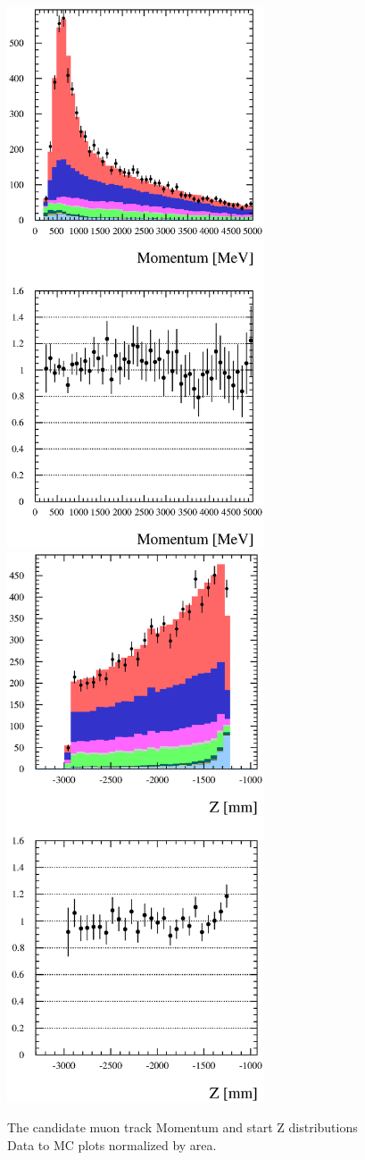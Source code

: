 \begin{figure}[h]
  \centering
  \includegraphics[width=3in]{Figures/P0DTrackerMomRun1Run2-normByRatio.eps}
  \includegraphics[width=3in]{Figures/P0DTrkZRun1Run2-normByRatio.eps}
  \caption{The candidate muon track Momentum and start Z distributions 
Data to MC plots normalized by area.}
  \label{fig:ResultsNormMomZ}%
\end{figure}


